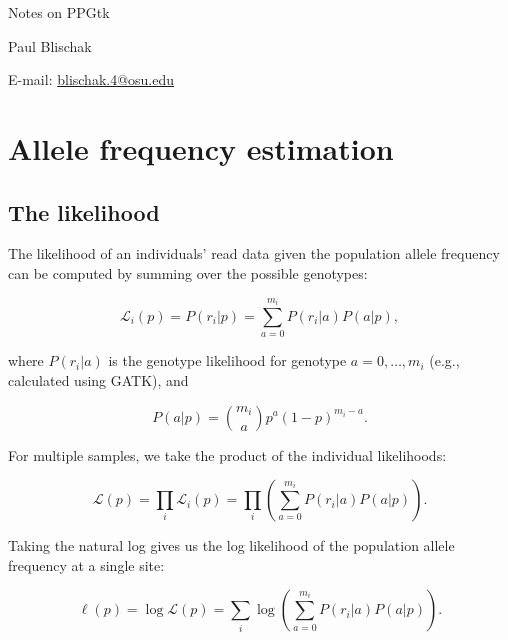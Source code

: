 \documentclass[11pt,english,letterpaper,oneside]{article}
\begin{document}
\pagestyle{empty}


	{\huge Notes on PPGtk}
	\vspace{0.2in}
	
	Paul Blischak
	
	E-mail: \href{mailto:blischak.4@osu.edu}{blischak.4@osu.edu}
	\vspace{0.2in}
		
\tableofcontents

\newpage

\clearpage
\pagestyle{plain}
\setcounter{page}{1}



\section{Allele frequency estimation}


\subsection{The likelihood}

The likelihood of an individuals' read data given the population allele frequency can be computed by summing over the possible genotypes:

\begin{equation}
\mathcal{L}_i(p) = P(r_i|p) = \sum_{a = 0}^{m_i} P(r_i|a)P(a|p),
\end{equation}

where $P(r_i|a)$ is the genotype likelihood for genotype $a = 0,\dots,m_i$ (e.g., calculated using GATK), and 

\begin{equation*}
P(a|p) = \binom{m_i}{a}p^a (1-p)^{m_i - a}.
\end{equation*}

For multiple samples, we take the product of the individual likelihoods:

\begin{equation}
\mathcal{L}(p) = \prod_i \mathcal{L}_i(p) = \prod_i \left(\sum_{a = 0}^{m_i} P(r_i|a)P(a|p)\right).
\end{equation}

Taking the natural log gives us the log likelihood of the population allele frequency at a single site:

\begin{equation}
\ell(p) = \log \mathcal{L}(p) = \sum_i \log \left( \sum_{a= 0}^{m_i} P(r_i|a)P(a|p)\right).
\end{equation}
\end{document}
